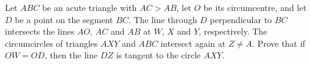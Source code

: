 Let $ABC$ be an acute triangle with $AC>AB$, let $O$ be its circumcentre,
and let $D$ be a point on the segment $BC$.
The line through $D$ perpendicular to $BC$ intersects the lines $AO$,
$AC$ and $AB$ at $W$, $X$ and $Y$, respectively.
The circumcircles of triangles $AXY$ and $ABC$ intersect again at $Z\neq A$.
Prove that if $OW=OD$, then the line $DZ$ is tangent to the circle $AXY$.

